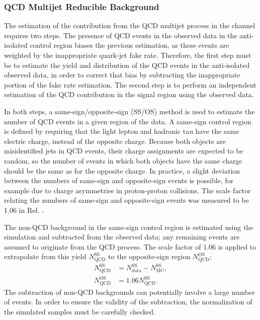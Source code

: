 \subsubsection{QCD Multijet Reducible Background}
\label{sec:qcdbkg}

The estimation of the contribution from the QCD multijet process in the \etau channel requires two steps. The presence of QCD events in the observed data in the \etau anti-isolated control region biases the previous estimation, as these events are weighted by the inappropriate quark-jet fake rate. Therefore, the first step must be to estimate the yield and \pt distribution of the QCD events in the anti-isolated observed data, in order to correct that bias by subtracting the inappropriate portion of the fake rate estimation. The second step is to perform an independent estimation of the QCD contribution in the signal region using the observed data.

In both steps, a same-sign/opposite-sign (SS/OS) method is used to estimate the number of QCD events in a given region of the data. A same-sign control region is defined by requiring that the light lepton and hadronic tau have the same electric charge, instead of the opposite charge. Because both objects are misidentified jets in QCD events, their charge assignments are expected to be random, so the number of events in which both objects have the same charge should be the same as for the opposite charge. In practice, a slight deviation between the numbers of same-sign and opposite-sign events is possible, for example due to charge asymmetries in proton-proton collisions. The scale factor relating the numbers of same-sign and opposite-sign events was measured to be 1.06 in Ref. \cite{CMS-AN-2013-178}.

The non-QCD background in the same-sign control region is estimated using the simulation and subtracted from the observed data; any remaining events are assumed to originate from the QCD process. The scale factor of 1.06 is applied to extrapolate from this yield $N_{\text{QCD}}^{\text{SS}}$ to the opposite-sign region $N_{\text{QCD}}^{\text{OS}}$:
\begin{align}
N_{\text{QCD}}^{\text{SS}} & = N_{\text{data}}^{\text{SS}} - N_{\text{MC}}^{\text{SS}}, \label{bkg:QCDss}\\
N_{\text{QCD}}^{\text{OS}} & = 1.06 N_{\text{QCD}}^{\text{SS}}. \label{bkg:QCDos}
\end{align}
The subtraction of non-QCD backgrounds can potentially involve a large number of events. In order to ensure the validity of the subtraction, the normalization of the simulated samples must be carefully checked.

